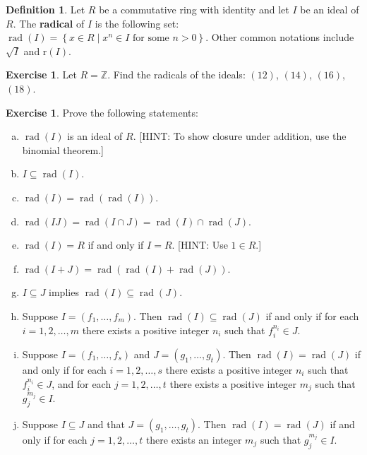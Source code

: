\documentclass{amsart}
\theoremstyle{plain}
\theoremstyle{definition}
\newtheorem{definition}{Definition}[section]
\newtheorem{exercise}[theorem]{Exercise}
\theoremstyle{definition}
\newcommand{\defining}[1]{\textbf{#1}}
\newcommand{\sse}{\subseteq}
\DeclareMathOperator{\radname}{rad}
\newcommand{\rad}[1]{\radname(#1)}
\begin{document}
\begin{definition}
Let $R$ be a commutative ring with identity and let $I$ be an ideal of $R$.
The \defining{radical} of $I$ is the following set:
$\rad{I} = \left\{ x \in R \mid x^{n} \in I \text{ for some } n > 0  \right\}$.
Other common notations include $\sqrt{I}$ and $\text{r}(I)$.
\end{definition}


\begin{exercise}
Let $R = \mathbb{Z}$.
Find the radicals of the ideals: $(12)$, $(14)$, $(16)$, $(18)$.
\end{exercise}


\begin{exercise}
Prove the following statements:
\begin{enumerate}[a.]
\item $\rad{I}$ is an ideal of $R$.
[HINT: To show closure under addition, use the binomial theorem.]

\item $I \sse \rad{I}$.

\item $\rad{I} = \rad{\rad{I}}$.

\item $\rad{I J} = \rad{I \cap J} = \rad{I} \cap \rad{J}$.

\item $\rad{I} = R$ if and only if $I = R$. [HINT: Use $1 \in R$.]

\item $\rad{I + J} = \rad{\rad{I} + \rad{J}}$.

\item $I \sse J$ implies $\rad{I} \sse \rad{J}$.

\item Suppose $I = (f_{1}, \ldots, f_{m})$.  Then $\rad{I} \sse
\rad{J}$ if and only if for each $i = 1, 2, \ldots, m$ there exists a positive
integer $n_{i}$ such that $f_{i}^{n_{i}} \in J$.

\item Suppose $I = (f_{1}, \ldots, f_{s})$ and $J = (g_{1}, \ldots, g_{t})$.
Then $\rad{I} = \rad{J}$ if and only if for each $i = 1, 2, \ldots, s$ there exists a
positive integer $n_{i}$ such that $f_{i}^{n_{i}} \in J$, and for each $j = 1, 2,
\ldots, t$ there exists a positive integer $m_{j}$ such that $g_{j}^{m_{j}} \in I$.

\item Suppose $I \sse J$ and that $J = (g_{1}, \ldots, g_{t})$.
Then $\rad{I} = \rad{J}$ if and only if for each $j = 1, 2, \ldots, t$ there exists an integer
$m_{j}$ such that $g_{j}^{m_{j}} \in I$.
%
\end{enumerate}
\end{exercise}
\end{document}

